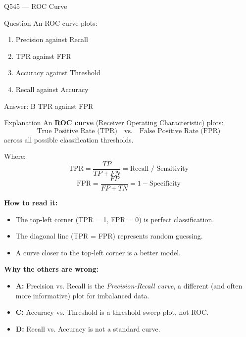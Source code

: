 \documentclass[aspectratio=169,8pt]{beamer}
\begin{document}
	\begin{frame}{Q545 --- ROC Curve}
		\begin{block}{Question}
			An ROC curve plots:
			
			\begin{enumerate}
				\item Precision against Recall
				\item TPR against FPR
				\item Accuracy against Threshold
				\item Recall against Accuracy
			\end{enumerate}
		\end{block}
		
		\begin{exampleblock}{Answer: B}
			TPR against FPR
		\end{exampleblock}
		
		\begin{block}{Explanation}
			An \textbf{ROC curve} (Receiver Operating Characteristic) plots:
			\[
			\text{True Positive Rate (TPR)} \quad \text{vs.} \quad \text{False Positive Rate (FPR)}
			\]
			across all possible classification thresholds.
			
			Where:
			\[
			\text{TPR} = \frac{TP}{TP+FN} = \text{Recall / Sensitivity}
			\]
			\[
			\text{FPR} = \frac{FP}{FP+TN} = 1 - \text{Specificity}
			\]
			
			\textbf{How to read it:}
			\begin{itemize}
				\item The top-left corner (TPR = 1, FPR = 0) is perfect classification.
				\item The diagonal line (TPR = FPR) represents random guessing.
				\item A curve closer to the top-left corner is a better model.
			\end{itemize}
			
			\textbf{Why the others are wrong:}
			\begin{itemize}
				\item \textbf{A:} Precision vs. Recall is the \emph{Precision-Recall curve},
				a different (and often more informative) plot for imbalanced data.
				\item \textbf{C:} Accuracy vs. Threshold is a threshold-sweep plot, not ROC.
				\item \textbf{D:} Recall vs. Accuracy is not a standard curve.
			\end{itemize}
		\end{block}
	\end{frame}
	
\end{document}
